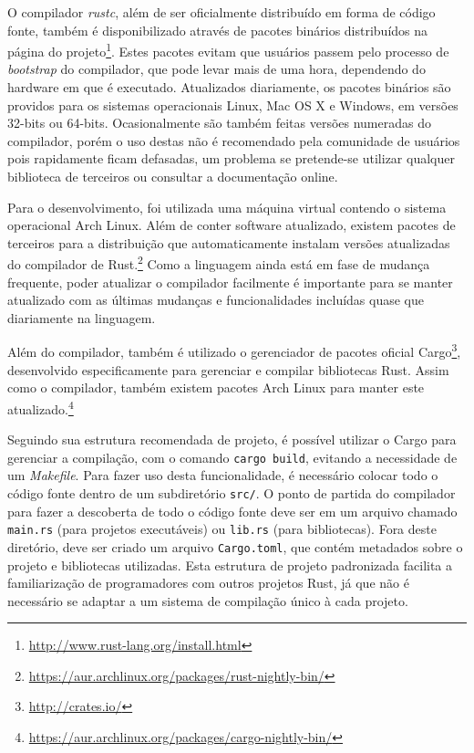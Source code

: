 \documentclass[tg]{mdtufsm}
\begin{document}
O compilador \emph{rustc}, além de ser oficialmente distribuído em forma de código fonte, também é disponibilizado através de pacotes binários distribuídos na página do projeto\footnote{\url{http://www.rust-lang.org/install.html}}. Estes pacotes evitam que usuários passem pelo processo de \emph{bootstrap} do compilador, que pode levar mais de uma hora, dependendo do hardware em que é executado. Atualizados diariamente, os pacotes binários são providos para os sistemas operacionais Linux, Mac OS X e Windows, em versões 32-bits ou 64-bits. Ocasionalmente são também feitas versões numeradas do compilador, porém o uso destas não é recomendado pela comunidade de usuários pois rapidamente ficam defasadas, um problema se pretende-se utilizar qualquer biblioteca de terceiros ou consultar a documentação online.

Para o desenvolvimento, foi utilizada uma máquina virtual contendo o sistema operacional Arch Linux. Além de conter software atualizado, existem pacotes de terceiros para a distribuição que automaticamente instalam versões atualizadas do compilador de Rust.\footnote{\url{https://aur.archlinux.org/packages/rust-nightly-bin/}} Como a linguagem ainda está em fase de mudança frequente, poder atualizar o compilador facilmente é importante para se manter atualizado com as últimas mudanças e funcionalidades incluídas quase que diariamente na linguagem.

Além do compilador, também é utilizado o gerenciador de pacotes oficial Cargo\footnote{\url{http://crates.io/}}, desenvolvido especificamente para gerenciar e compilar bibliotecas Rust. Assim como o compilador, também existem pacotes Arch Linux para manter este atualizado.\footnote{\url{https://aur.archlinux.org/packages/cargo-nightly-bin/}}

Seguindo sua estrutura recomendada de projeto, é possível utilizar o Cargo para gerenciar a compilação, com o comando \texttt{cargo build}, evitando a necessidade de um \emph{Makefile}. Para fazer uso desta funcionalidade, é necessário colocar todo o código fonte dentro de um subdiretório \texttt{src/}. O ponto de partida do compilador para fazer a descoberta de todo o código fonte deve ser em um arquivo chamado \texttt{main.rs} (para projetos executáveis) ou \texttt{lib.rs} (para bibliotecas). Fora deste diretório, deve ser criado um arquivo \texttt{Cargo.toml}, que contém metadados sobre o projeto e bibliotecas utilizadas. Esta estrutura de projeto padronizada facilita a familiarização de programadores com outros projetos Rust, já que não é necessário se adaptar a um sistema de compilação único à cada projeto.
\end{document}
